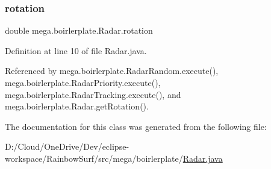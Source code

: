 \subsubsection{\texorpdfstring{rotation}{rotation}}
{\footnotesize\ttfamily double mega.\+boirlerplate.\+Radar.\+rotation\hspace{0.3cm}{\ttfamily [protected]}}



Definition at line 10 of file Radar.\+java.



Referenced by mega.\+boirlerplate.\+Radar\+Random.\+execute(), mega.\+boirlerplate.\+Radar\+Priority.\+execute(), mega.\+boirlerplate.\+Radar\+Tracking.\+execute(), and mega.\+boirlerplate.\+Radar.\+get\+Rotation().



The documentation for this class was generated from the following file\+:\begin{DoxyCompactItemize}
\item 
D\+:/\+Cloud/\+One\+Drive/\+Dev/eclipse-\/workspace/\+Rainbow\+Surf/src/mega/boirlerplate/\hyperlink{_radar_8java}{Radar.\+java}\end{DoxyCompactItemize}
